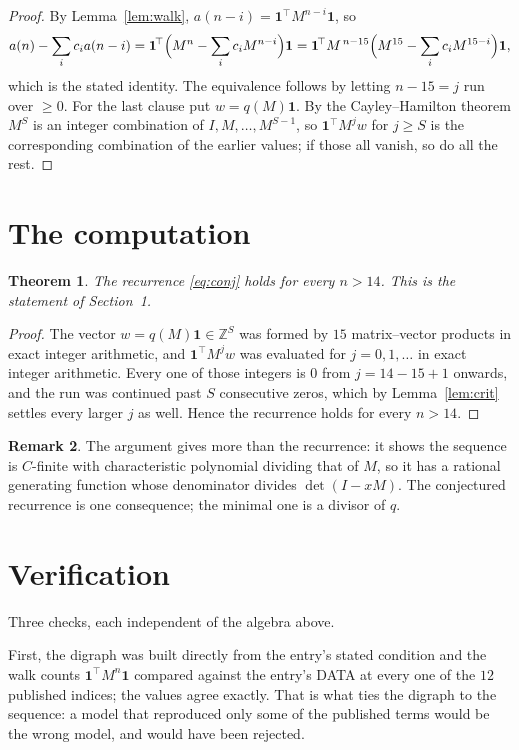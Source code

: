 \documentclass[11pt,a4paper]{article}
\theoremstyle{plain}
\newtheorem{theorem}{Theorem}
\theoremstyle{definition}
\newtheorem{remark}[theorem]{Remark}
\begin{document}
\begin{proof}
By Lemma~\ref{lem:walk}, $a(n-i)=\mathbf{1}^{\!\top}M^{n-i}\mathbf{1}$, so
\[
a(n)-\sum_i c_i a(n-i)
=\mathbf{1}^{\!\top}\Bigl(M^{n}-\sum_i c_i M^{n-i}\Bigr)\mathbf{1}
=\mathbf{1}^{\!\top}M^{\,n-15}\Bigl(M^{15}-\sum_i c_i M^{15-i}\Bigr)\mathbf{1},
\]
which is the stated identity. The equivalence follows by letting $n-15=j$ run over
$\ge0$. For the last clause put $w=q(M)\mathbf{1}$. By the Cayley--Hamilton theorem
$M^{S}$ is an integer combination of $I,M,\dots,M^{S-1}$, so
$\mathbf{1}^{\!\top}M^{j}w$ for $j\ge S$ is the corresponding combination of the
earlier values; if those all vanish, so do all the rest.
\end{proof}

\section{The computation}

\begin{theorem}
The recurrence \eqref{eq:conj} holds for every $n>14$. This is the statement of
Section~1.
\end{theorem}

\begin{proof}
The vector $w=q(M)\mathbf{1}\in\mathbb{Z}^{S}$ was formed by $15$ matrix--vector
products in exact integer arithmetic, and $\mathbf{1}^{\!\top}M^{j}w$ was evaluated for
$j=0,1,\dots$ in exact integer arithmetic. Every one of those integers is $0$ from
$j=14-15+1$ onwards, and the run was continued past $S$ consecutive zeros, which by
Lemma~\ref{lem:crit} settles every larger $j$ as well. Hence the recurrence holds for
every $n>14$.
\end{proof}

\begin{remark}
The argument gives more than the recurrence: it shows the sequence is $C$-finite with
characteristic polynomial dividing that of $M$, so it has a rational generating function
whose denominator divides $\det(I-xM)$. The conjectured recurrence is one consequence; the
minimal one is a divisor of $q$.
\end{remark}

\section{Verification}

Three checks, each independent of the algebra above.

First, the digraph was built directly from the entry's stated condition and the walk counts
$\mathbf{1}^{\!\top}M^{n}\mathbf{1}$ compared against the entry's DATA at every one of
the $12$ published indices; the values agree exactly. That is what ties the digraph to
the sequence: a model that reproduced only some of the published terms would be the wrong
model, and would have been rejected.
\end{document}
